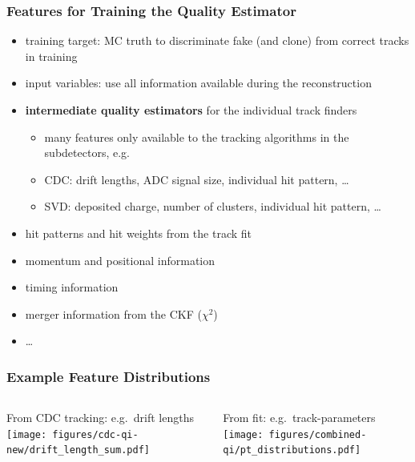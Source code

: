 \documentclass[18pt, aspectratio=169]{beamer}
\newcommand{\kitemph}[1]{\textcolor{kit-green100}{\bf{#1}}}
\begin{document}
\begin{frame}
  \frametitle{Features for Training the Quality Estimator}
    \begin{itemize}
    \item training target: MC truth to discriminate fake (and clone) from correct tracks in training
    \item input variables: use all information available during the reconstruction
    \item \kitemph{intermediate quality estimators} for the individual track finders
      \begin{itemize}
      \item many features only available to the tracking algorithms in the subdetectors, e.g.
      \item CDC: drift lengths, ADC signal size, individual hit pattern, \ldots
      \item SVD: deposited charge, number of clusters, individual hit pattern, \ldots
      \end{itemize}
    \item hit patterns and hit weights from the track fit
    \item momentum and positional information
    \item timing information
    \item merger information from the CKF ($\chi^2$)
    \item \ldots
    \end{itemize}
\end{frame}

\begin{frame} 
  \frametitle{Example Feature Distributions}
  \begin{columns}[t]
    \begin{column}{.5\textwidth}
      \center
      From CDC tracking: e.g.\ drift lengths
      \texttt{[image: figures/cdc-qi-new/drift\_length\_sum.pdf]}
    \end{column}
    \begin{column}{.5\textwidth}
      \center
      From fit: e.g.\ track-parameters
    \texttt{[image: figures/combined-qi/pt\_distributions.pdf]}
    \end{column}
  \end{columns}
  
\end{frame}
\end{document}
